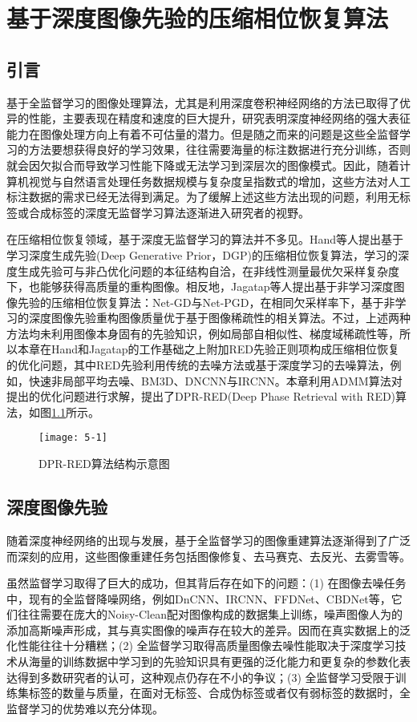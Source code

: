 \chapter{基于深度图像先验的压缩相位恢复算法}
\label{chap:dip}

\section{引言}
基于全监督学习的图像处理算法，尤其是利用深度卷积神经网络的方法已取得了优异的性能，主要表现在精度和速度的巨大提升，研究表明深度神经网络的强大表征能力在图像处理方向上有着不可估量的潜力。但是随之而来的问题是这些全监督学习的方法要想获得良好的学习效果，往往需要海量的标注数据进行充分训练，否则就会因欠拟合而导致学习性能下降或无法学习到深层次的图像模式。因此，随着计算机视觉与自然语言处理任务数据规模与复杂度呈指数式的增加，这些方法对人工标注数据的需求已经无法得到满足。为了缓解上述这些方法出现的问题，利用无标签或合成标签的深度无监督学习算法逐渐进入研究者的视野。

在压缩相位恢复领域，基于深度无监督学习的算法并不多见。Hand等人提出基于学习深度生成先验(Deep Generative Prior，DGP)的压缩相位恢复算法，学习的深度生成先验可与非凸优化问题的本征结构自洽，在非线性测量最优欠采样复杂度下，也能够获得高质量的重构图像。相反地，Jagatap等人提出基于非学习深度图像先验的压缩相位恢复算法：Net-GD与Net-PGD，在相同欠采样率下，基于非学习的深度图像先验重构图像质量优于基于图像稀疏性的相关算法。不过，上述两种方法均未利用图像本身固有的先验知识，例如局部自相似性\supercite{Buades}、梯度域稀疏性等，所以本章在Hand和Jagatap的工作基础之上附加RED先验正则项构成压缩相位恢复的优化问题，其中RED先验利用传统的去噪方法或基于深度学习的去噪算法，例如，快速非局部平均去噪、BM3D、DNCNN与IRCNN。本章利用ADMM算法对提出的优化问题进行求解，提出了DPR-RED(Deep Phase Retrieval with RED)算法，如图\ref{fig:5-1}所示。
\begin{figure}[!htbp]
	\centering
	\texttt{[image: 5-1]}
	\caption{DPR-RED算法结构示意图}\label{fig:5-1}
\end{figure}

\section{深度图像先验}
随着深度神经网络的出现与发展，基于全监督学习的图像重建算法逐渐得到了广泛而深刻的应用，这些图像重建任务包括图像修复、去马赛克、去反光、去雾雪等\supercite{FanQingnan}。

虽然监督学习取得了巨大的成功，但其背后存在如下的问题：(1) 在图像去噪任务中，现有的全监督降噪网络，例如DnCNN、IRCNN、FFDNet、CBDNet等，它们往往需要在庞大的Noisy-Clean配对图像构成的数据集上训练，噪声图像人为的添加高斯噪声形成，其与真实图像的噪声存在较大的差异。因而在真实数据上的泛化性能往往十分糟糕；(2) 全监督学习取得高质量图像去噪性能取决于深度学习技术从海量的训练数据中学习到的先验知识具有更强的泛化能力和更复杂的参数化表达得到多数研究者的认可，这种观点仍存在不小的争议；(3) 全监督学习受限于训练集标签的数量与质量，在面对无标签、合成伪标签或者仅有弱标签的数据时，全监督学习的优势难以充分体现。

